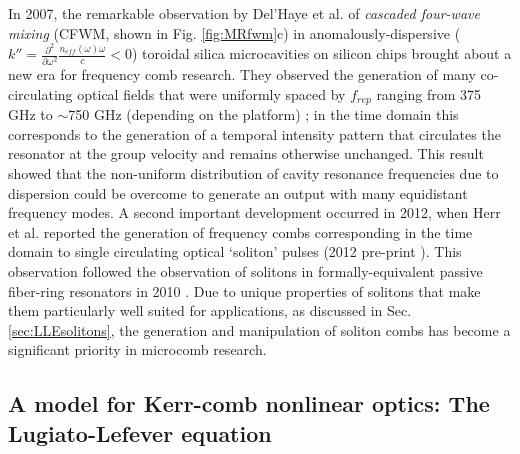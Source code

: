 In 2007, the remarkable observation by Del'Haye et al. of \textit{cascaded four-wave mixing} (CFWM, shown in Fig. \ref{fig:MRfwm}c) in anomalously-dispersive ($k''=\frac{\partial^2}{\partial\omega^2}\frac{n_{eff}(\omega)\omega}{c}<0$) toroidal silica microcavities on silicon chips brought about a new era for frequency comb research. They observed the generation of many co-circulating optical fields that were uniformly spaced by $f_{rep}$ ranging from 375 GHz to $\sim$750 GHz (depending on the platform) \cite{DelHaye2007}; in the time domain this corresponds to the generation of a temporal intensity pattern that circulates the resonator at the group velocity and remains otherwise unchanged. This result showed that the non-uniform distribution of cavity resonance frequencies due to dispersion could be overcome to generate an output with many equidistant frequency modes. A second important development occurred in 2012, when Herr et al. reported the generation of frequency combs corresponding in the time domain to single circulating optical `soliton' pulses \cite{Herr2014} (2012 pre-print \cite{Herr2012a}). This observation followed the observation of solitons in formally-equivalent passive fiber-ring resonators in 2010 \cite{Leo2010a}. Due to unique properties of solitons that make them particularly well suited for applications, as discussed in Sec. \ref{sec:LLEsolitons}, the generation and manipulation of soliton combs has become a significant priority in microcomb research. 

\subsection{A model for Kerr-comb nonlinear optics: The Lugiato-Lefever equation}\label{sec:LLE}

